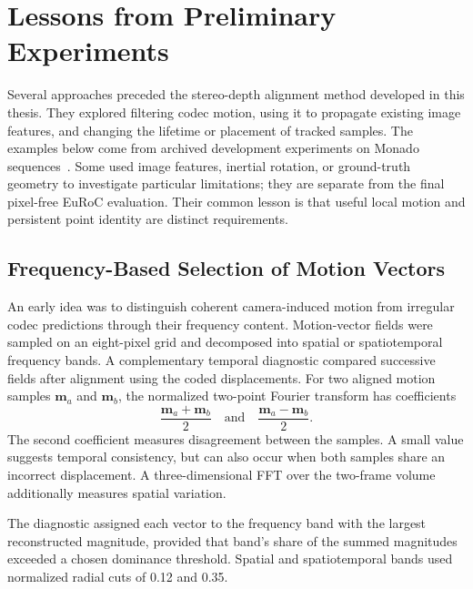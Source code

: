 
\clearpage
\section{Lessons from Preliminary Experiments}\label{appendix:prior-experiments}

Several approaches preceded the stereo-depth alignment method developed in
this thesis. They explored filtering codec motion, using it to propagate
existing image features, and changing the lifetime or placement of tracked
samples. The examples below come from archived development experiments on
Monado sequences~\cite{deMayoCremersPireMSD}. Some used image features, inertial
rotation, or ground-truth geometry to investigate particular limitations; they
are separate from the final pixel-free EuRoC evaluation. Their common lesson
is that useful local motion and persistent point identity are distinct
requirements.

\subsection{Frequency-Based Selection of Motion Vectors}

An early idea was to distinguish coherent camera-induced motion from irregular
codec predictions through their frequency content. Motion-vector fields were
sampled on an eight-pixel grid and decomposed into spatial or spatiotemporal
frequency bands. A complementary temporal diagnostic compared successive
fields after alignment using the coded displacements. For two aligned motion
samples $\mathbf{m}_a$ and $\mathbf{m}_b$, the normalized two-point Fourier
transform has coefficients
\begin{equation}
  \frac{\mathbf{m}_a+\mathbf{m}_b}{2}
  \quad\text{and}\quad
  \frac{\mathbf{m}_a-\mathbf{m}_b}{2}.
\end{equation}
The second coefficient measures disagreement between the samples. A small
value suggests temporal consistency, but can also occur when both samples
share an incorrect displacement. A three-dimensional FFT over the two-frame
volume additionally measures spatial variation.

The diagnostic assigned each vector to the frequency band with the largest
reconstructed magnitude, provided that band's share of the summed magnitudes
exceeded a chosen dominance threshold. Spatial and spatiotemporal bands used
normalized radial cuts of 0.12 and 0.35.

